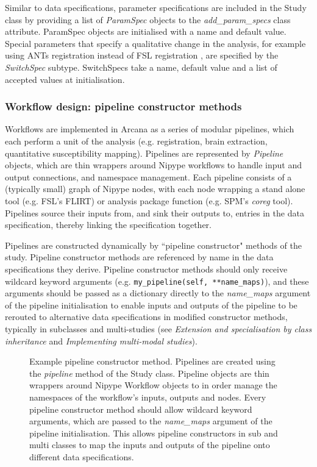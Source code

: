 \documentclass[smallextended]{svjour3}       %
\begin{document}
Similar to data specifications, parameter specifications are included in
the Study class by providing a list of \emph{ParamSpec} objects to
the \emph{add\_param\_specs} class attribute. ParamSpec objects
are initialised with a name and default value. Special parameters that
specify a qualitative change in the analysis, for example using ANTs
registration \citep{avants_reproducible_2011} instead of FSL registration
\citep{smith_advances_2004}, are specified by the \emph{SwitchSpec} subtype.
SwitchSpecs take a name, default value and a list of accepted values at
initialisation.

\subsubsection*{Workflow design: pipeline constructor methods}
\label{sec:pipeline-constructors}

Workflows are implemented in Arcana as a series of modular pipelines, which
each perform a unit of the analysis (e.g. registration, brain
extraction, quantitative susceptibility mapping). Pipelines are represented by \emph{Pipeline} objects,
which are thin wrappers around Nipype workflows to handle input and output
connections, and namespace management. Each pipeline consists of a
(typically small) graph of Nipype nodes, with each node wrapping a stand alone tool
(e.g. FSL's FLIRT) or analysis package function (e.g. SPM's \emph{coreg}
tool). Pipelines source their inputs from, and sink their outputs to, entries
in the data specification, thereby linking the specification together.

Pipelines are constructed dynamically by ``pipeline constructor" methods
of the study. Pipeline constructor methods are referenced by name in the
data specifications they derive. Pipeline constructor methods should only
receive wildcard keyword arguments (e.g. \lstinline{my_pipeline(self, **name_maps)}),
and these arguments should be passed as a dictionary directly to the \emph{name\_maps} argument
of the pipeline initialisation to enable inputs and outputs of the
pipeline to be rerouted to alternative data specifications in modified constructor
methods, typically in subclasses and multi-studies (see
\emph{Extension and specialisation by class inheritance} and \emph{Implementing multi-modal studies}).

\begin{figure}

\caption{Example pipeline constructor method. Pipelines are
created using the \emph{pipeline} method of the Study class.
Pipeline objects are thin wrappers around Nipype Workflow objects to
in order manage the namespaces of the workflow's inputs, outputs and nodes. Every
pipeline constructor method should allow wildcard keyword arguments,
which are passed to the \emph{name\_maps} argument of the pipeline
initialisation. This allows pipeline constructors in sub and multi classes to map the
inputs and outputs of the pipeline onto different data specifications.}
\label{fig:pipeline_constructor}
\end{figure}
\end{document}
